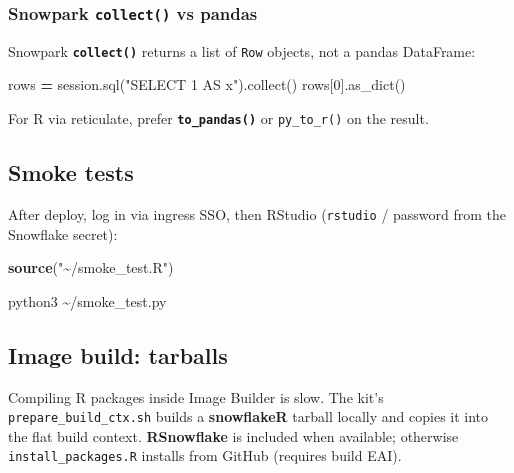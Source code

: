\documentclass[
]{article}
\newenvironment{Shaded}{\begin{snugshade}}{\end{snugshade}}
\newcommand{\DecValTok}[1]{\textcolor[rgb]{0.00,0.00,0.81}{#1}}
\newcommand{\ExtensionTok}[1]{#1}
\newcommand{\FunctionTok}[1]{\textcolor[rgb]{0.13,0.29,0.53}{\textbf{#1}}}
\newcommand{\NormalTok}[1]{#1}
\newcommand{\OperatorTok}[1]{\textcolor[rgb]{0.81,0.36,0.00}{\textbf{#1}}}
\newcommand{\StringTok}[1]{\textcolor[rgb]{0.31,0.60,0.02}{#1}}
\begin{document}
\subsubsection{\texorpdfstring{Snowpark \texttt{collect()} vs
pandas}{Snowpark collect() vs pandas}}\label{snowpark-collect-vs-pandas}

Snowpark \textbf{\texttt{collect()}} returns a list of \texttt{Row}
objects, not a pandas DataFrame:

\begin{Shaded}
\begin{Highlighting}[]
\NormalTok{rows }\OperatorTok{=}\NormalTok{ session.sql(}\StringTok{"SELECT 1 AS x"}\NormalTok{).collect()}
\NormalTok{rows[}\DecValTok{0}\NormalTok{].as\_dict()}
\end{Highlighting}
\end{Shaded}

For R via reticulate, prefer \textbf{\texttt{to\_pandas()}} or
\texttt{py\_to\_r()} on the result.

\subsection{Smoke tests}\label{smoke-tests}

After deploy, log in via ingress SSO, then RStudio (\texttt{rstudio} /
password from the Snowflake secret):

\begin{Shaded}
\begin{Highlighting}[]
\FunctionTok{source}\NormalTok{(}\StringTok{"\textasciitilde{}/smoke\_test.R"}\NormalTok{)}
\end{Highlighting}
\end{Shaded}

\begin{Shaded}
\begin{Highlighting}[]
\ExtensionTok{python3}\NormalTok{ \textasciitilde{}/smoke\_test.py}
\end{Highlighting}
\end{Shaded}

\subsection{Image build: tarballs}\label{image-build-tarballs}

Compiling R packages inside Image Builder is slow. The kit's
\texttt{prepare\_build\_ctx.sh} builds a \textbf{snowflakeR} tarball
locally and copies it into the flat build context. \textbf{RSnowflake}
is included when available; otherwise \texttt{install\_packages.R}
installs from GitHub (requires build EAI).
\end{document}

